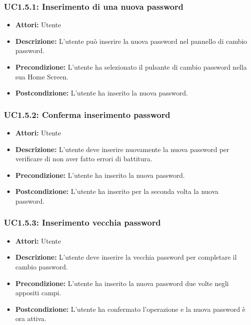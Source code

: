 \subsubsection{UC1.5.1: Inserimento di una nuova password}

\begin{itemize}
    \item \textbf{Attori:} Utente
    \item \textbf{Descrizione:} L'utente può inserire la nuova password nel pannello di cambio password.
    \item \textbf{Precondizione:} L'utente ha selezionato il pulsante di cambio password nella sua Home Screen.
    \item \textbf{Postcondizione:} L'utente ha inserito la nuova password.
\end{itemize}

\subsubsection{UC1.5.2: Conferma inserimento password }

\begin{itemize}
    \item \textbf{Attori:} Utente
    \item \textbf{Descrizione:} L'utente deve inserire nuovamente la nuova password per verificare di non aver fatto errori di battitura.
    \item \textbf{Precondizione:} L'utente ha inserito la nuova password.
    \item \textbf{Postcondizione:} L'utente ha inserito per la seconda volta la nuova password.
\end{itemize}

\subsubsection{UC1.5.3: Inserimento vecchia password}

\begin{itemize}
    \item \textbf{Attori:} Utente
    \item \textbf{Descrizione:} L'utente deve inserire la vecchia password per completare il cambio password.
    \item \textbf{Precondizione:} L'utente ha inserito la nuova password due volte negli appositi campi.
    \item \textbf{Postcondizione:} L'utente ha confermato l'operazione e la nuova password è ora attiva.
\end{itemize}

